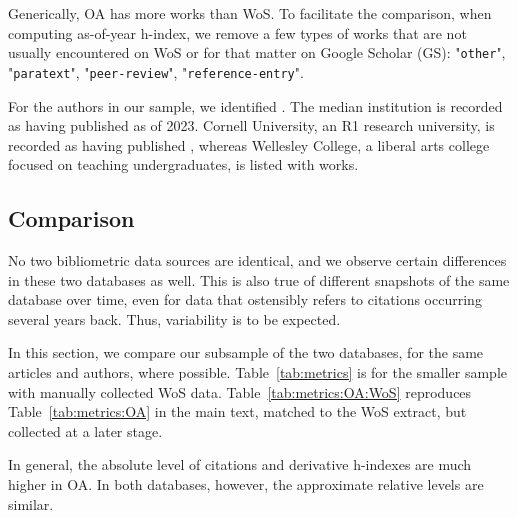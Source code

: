 Generically, OA has more works than WoS. To facilitate the comparison, when computing as-of-year h-index, we remove a few types of works that are not usually encountered on WoS or for that matter on Google Scholar (GS): "\texttt{other}", "\texttt{paratext}", "\texttt{peer-review}", "\texttt{reference-entry}". 

For the  authors in our sample, we identified . The median institution is recorded as having published  as of 2023. Cornell University, an R1 research university, is recorded as having published , whereas Wellesley College, a liberal arts college focused on teaching undergraduates, is listed with  works. 

\subsection{Comparison}

No two bibliometric data sources are identical, and we observe certain differences in these two databases as well. This is also true of different snapshots of the same database over time, even for data that ostensibly refers to citations occurring several years back. Thus, variability is to be expected. 

In this section, we compare our subsample of the two databases, for the same articles and authors, where possible. Table~\ref{tab:metrics} is for the smaller sample with manually collected WoS data. Table~\ref{tab:metrics:OA:WoS} reproduces Table~\ref{tab:metrics:OA} in the main text, matched to the WoS extract, but collected at a later stage.






In general, the absolute level of citations and derivative h-indexes are much higher in OA. In both databases, however, the approximate relative levels are similar.
